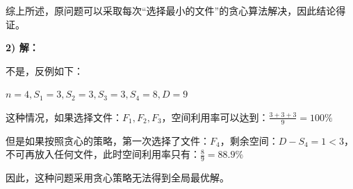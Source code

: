 \documentclass[UTF8,12pt,a4paper]{ctexart}
\begin{document}
\begin{enumerate}[1.]
\begin{enumerate}
		综上所述，原问题可以采取每次“选择最小的文件”的贪心算法解决，因此结论得证。
	\end{enumerate}

	\textbf{2) 解：}

	不是，反例如下：

	$n=4, S_1 = 3, S_2 = 3, S_3 = 3, S_4 = 8, D=9$
	
	这种情况，如果选择文件：$F_1, F_2, F_3$，空间利用率可以达到：$\frac{3+3+3}{9}=100\%$
	
	但是如果按照贪心的策略，第一次选择了文件：$F_4$，剩余空间：$D-S_4=1<3$，不可再放入任何文件，此时空间利用率只有：$\frac{8}{9}=88.9\%$

	因此，这种问题采用贪心策略无法得到全局最优解。
\end{enumerate}
\end{document}
